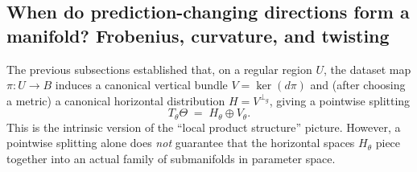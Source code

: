 

\subsection{When do prediction-changing directions form a manifold? Frobenius, curvature, and twisting}
\label{subsec:frobenius_curvature_prediction_changing}

The previous subsections established that, on a regular region $U$, the dataset map
$\pi:U\to B$ induces a canonical vertical bundle $V=\ker(d\pi)$ and (after choosing a metric)
a canonical horizontal distribution $H=V^{\perp_g}$, giving a pointwise splitting
\[
T_\theta\Theta \;=\; H_\theta \oplus V_\theta.
\]
This is the intrinsic version of the ``local product structure'' picture.
However, a pointwise splitting alone does \emph{not} guarantee that the horizontal spaces
$H_\theta$ piece together into an actual family of submanifolds in parameter space.

